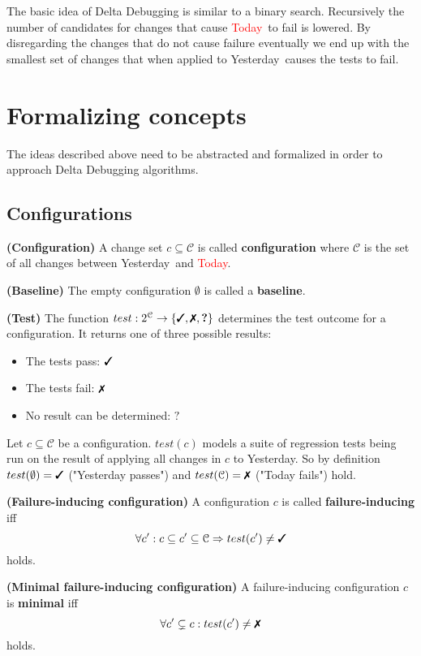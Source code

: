 \documentclass[a4paper,UKenglish]{lipics-v2018}
\newcommand{\green}[1]{\textcolor{td-green}{#1}}
\newcommand{\red}[1]{\textcolor{red}{#1}}
\newcommand{\yd}[0]{\green{Yesterday}}
\newcommand{\td}[0]{\red{Today}}
\newcommand{\C}[0]{\ensuremath{\mathcal{C}}}
\newcommand{\cmark}{\text{\ding{51}}}
\newcommand{\xmark}{\text{\ding{55}}}
\newcommand{\qmark}{\textbf{?}}
\newcommand{\defsub}[1]{\textbf{(#1)} }
\newcommand{\set}[1]{\left \{ #1 \right \}}
\begin{document}
The basic idea of Delta Debugging is similar to a binary search. Recursively the number of candidates for changes that cause \td\ to fail is lowered. By disregarding the changes that do not cause failure eventually we end up with the smallest set of changes that when applied to \yd\ causes the tests to fail. 



\section{Formalizing concepts}
\label{sec:formalizing_concepts}

The ideas described above need to be abstracted and formalized in order to approach Delta Debugging algorithms.

\subsection{Configurations}

 \defsub{Configuration} A change set $c \subseteq \C$ is called \textbf{configuration} where $\C$ is the set of all changes between \yd\ and \td.

 \defsub{Baseline} The empty configuration $\emptyset$ is called a \textbf{baseline}.

 \defsub{Test} The function $test: 2^{\C} \to \set{\cmark, \xmark, \qmark}$ determines the test outcome for a configuration. It returns one of three possible results: 
\begin{itemize}
	\item The tests pass: $\cmark$
	\item The tests fail: $\xmark$
	\item No result can be determined: $\qmark$
\end{itemize} 

Let $c \subseteq \C$ be a configuration. $test(c)$ models a suite of regression tests being run on the result of applying all changes in $c$ to \yd. So by definition $test(\emptyset) = \cmark$ ("Yesterday passes") and $test(\C) = \xmark$ ("Today fails") hold.

 \defsub{Failure-inducing configuration} A configuration $c$ is called \textbf{failure-inducing} iff 
\[ \forall c' : c \subseteq c' \subseteq \C \Rightarrow test(c') \ne \cmark \] 
holds.

 \defsub{Minimal failure-inducing configuration} A failure-inducing configuration $c$ is \textbf{minimal} iff 
\[ \forall c' \subsetneq c: test(c') \ne \xmark \]
holds.\\
\end{document}
